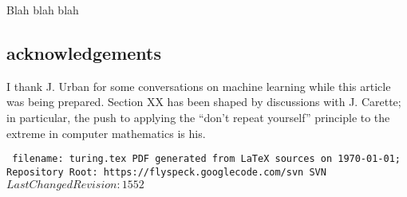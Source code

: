 \documentclass{llncs}
\def\svninfo{{\tt
  filename: turing.tex\hfill\break
  PDF generated from LaTeX sources on \today; \hfill\break
  Repository Root: https://flyspeck.googlecode.com/svn \hfill\break
  SVN $LastChangedRevision: 1552 $
  }
  }
\begin{document}
\bigskip
Blah blah blah





\subsection{acknowledgements}

I thank J. Urban for some conversations on machine learning while this
article was being prepared. Section XX has been shaped by
discussions with J. Carette; in particular, the push to applying the
``don't repeat yourself'' principle to the extreme in computer mathematics is
his.

\raggedright



\bigskip
\noindent
\svninfo
\end{document}
